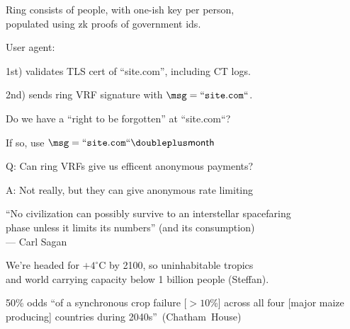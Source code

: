 \documentclass{beamer}
\begin{document}
\begin{frame} %

Ring consists of people, with one-ish key per person, \\
\hspace{10pt} populated using zk proofs of government ids.

\bigskip\smallskip

User agent: \\ \smallskip

1st) validates TLS cert of ``site.com'', including CT logs. \\ \smallskip

2nd) sends ring VRF signature with $\msg = \mathtt{``site.com``}$. \\ \smallskip

\pause\bigskip\bigskip

Do we have a ``right to be forgotten'' at ``site.com``? \\ \smallskip

\hspace{10pt} If so, use $\msg = \mathtt{``site.com``} \doubleplus \mathsf{month}$

\end{frame}



\begin{frame}

Q: Can ring VRFs give us efficent anonymous payments?

\bigskip

A: Not really, but they can give anonymous rate limiting

\end{frame}



\begin{frame}

``No civilization can possibly survive to an interstellar spacefaring \\ \smallskip
\hspace{1pt} phase unless it limits its numbers'' (and its consumption) \\ \medskip
\hspace{1pt} --- Carl Sagan

\bigskip\bigskip

We're headed for $+4^{\circ}$C by 2100, so uninhabitable tropics \\
\hspace{10pt} and world carrying capacity below 1 billion people (Steffan). \\ \bigskip

50\% odds ``of a synchronous crop failure [$>10$\%] across all four [major maize producing] countries during 2040s''~(Chatham~House) \\

\end{frame}
\end{document}
